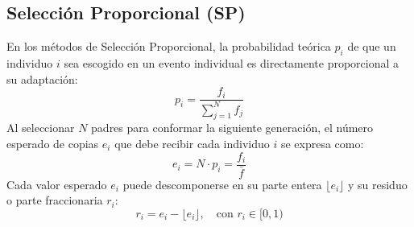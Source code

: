 \documentclass[11pt,letterpaper]{article}
\begin{document}
\subsection{Selección Proporcional (SP)}
En los métodos de Selección Proporcional, la probabilidad teórica $p_i$ de que un individuo $i$ sea escogido en un evento individual es directamente proporcional a su adaptación:
\begin{equation}
    p_i = \frac{f_i}{\sum_{j=1}^{N} f_j}
    \label{eq:prob_sp}
\end{equation}
Al seleccionar $N$ padres para conformar la siguiente generación, el número esperado de copias $e_i$ que debe recibir cada individuo $i$ se expresa como:
\begin{equation}
    e_i = N \cdot p_i = \frac{f_i}{\bar{f}}
    \label{eq:val_esperado}
\end{equation}
Cada valor esperado $e_i$ puede descomponerse en su parte entera $\lfloor e_i \rfloor$ y su residuo o parte fraccionaria $r_i$:
\begin{equation}
    r_i = e_i - \lfloor e_i \rfloor, \quad \text{con } r_i \in [0, 1)
    \label{eq:parte_frac}
\end{equation}
\end{document}
